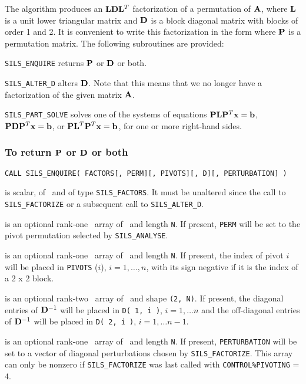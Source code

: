 \documentclass{galahad}
\newcommand{\packagename}{SILS}
\begin{document}
The algorithm produces an ${\mathbf{L}} {\mathbf{D}} {\mathbf{L}}^T$ factorization 
of a permutation of ${\mathbf{A}}$, where ${\mathbf{L}}$ is a unit lower triangular 
matrix and ${\mathbf{D}}$ is a block diagonal matrix with blocks of order 
1 and 2. It is convenient to write this factorization in the form 
where ${\mathbf{P}}$ is a permutation matrix. The following subroutines 
are provided: 
\begin{description} 
\ittf{} {\tt \packagename\_ENQUIRE} returns ${\mathbf{P}}$ or ${\mathbf{D}}$ or both. 
 
\ittf{} {\tt \packagename\_ALTER\_D} alters ${\mathbf{D}}$. Note that this means that 
we no longer have a factorization of the given matrix ${\mathbf{A}}$. 
 
\ittf{} {\tt \packagename\_PART\_SOLVE} solves one of the systems of equations 
${\mathbf{P}} {\mathbf{L}} {\mathbf{P}}^T {\mathbf{x}} =  {\mathbf{b}}$,  
${\mathbf{P}} {\mathbf{D}} {\mathbf{P}}^T {\mathbf{x}} =  {\mathbf{b}}$, or 
${\mathbf{P}} {\mathbf{L}}^T {\mathbf{P}}^T {\mathbf{x}} =  {\mathbf{b}}$, 
for one or more right-hand sides. 
 
\end{description} 
 
\subsubsection{To return ${\mathbf{P}}$ or ${\mathbf{D}}$ or both}
 
\hskip0.5in 
{\tt CALL \packagename\_ENQUIRE( FACTORS[, PERM][, PIVOTS][, D][, PERTURBATION] )}
 
\begin{description} 
 is scalar, of \intentin\ and of type {\tt \packagename\_FACTORS}.
It must be unaltered since the call to {\tt \packagename\_FACTORIZE} 
or a subsequent call to {\tt \packagename\_ALTER\_D}. 
 
 is an optional rank-one \integer\ array of \intentout\
 and length {\tt N}.
If present, {\tt PERM} will be set to the pivot permutation
selected by {\tt \packagename\_ANALYSE}.
  
 is an optional rank-one \integer\ array of \intentout\
 and length {\tt N}.
If present, the index of pivot $i$ will be placed in 
{\tt PIVOTS} ($i$), $i = 1, \ldots, n$, with its sign negative if it is 
the index of a 2 x 2 block. 
  
 is an optional rank-two \realdp\ array
of \intentout\, and shape {\tt (2, N)}.
If present, the diagonal entries of ${\mathbf{D}}^{-1} $ will 
be placed in {\tt D( 1, i )}, $i = 1, \ldots n$ and the off-diagonal 
entries of ${\mathbf{D}}^{-1} $ will be placed in {\tt D( 2, i )}, 
$i = 1, \ldots n-1$. 

 is an optional rank-one \realdp\ array of 
\intentout\ and length {\tt N}.
If present, {\tt PERTURBATION} will be set to a vector of diagonal perturbations
chosen by {\tt \packagename\_FACTORIZE}. This array can only be nonzero if
{\tt \packagename\_FACTORIZE} was last called with {\tt CONTROL\%PIVOTING} = 4.

\end{description} 
 
\end{document}
